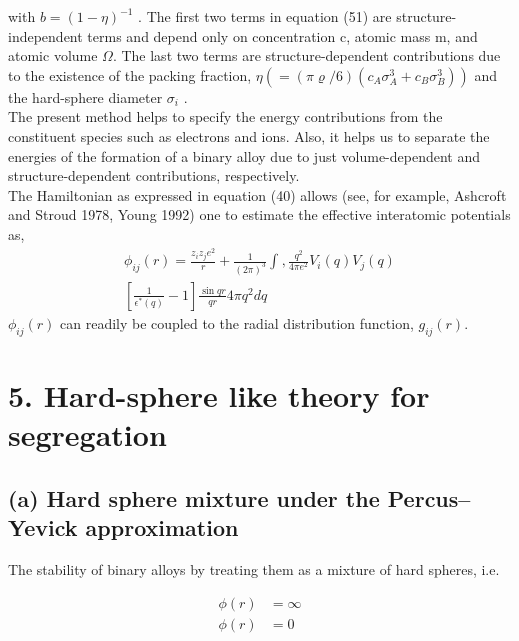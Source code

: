 \documentclass[12pt]{article}
\newcommand*{\1}{\hspace{1pt}}
\begin{document}
with $b = (1 - \eta)^{-1}$ . The first two terms in equation (51) are structure-independent terms and 
depend only on concentration c, atomic mass m, and atomic volume $\Omega $. The last two terms are 
structure-dependent contributions due to the existence of the packing
fraction, $\eta (= (\pi \varrho/6)(c_A\sigma^3_A + c_B\sigma^3_{B})) $ and the hard-sphere diameter $\sigma _{i}$ .\\
    The present method helps to specify the energy contributions from the constituent
species such as electrons and ions. Also, it helps us to separate the energies of the formation
of a binary alloy due to just volume-dependent and structure-dependent contributions,
respectively.\\
The Hamiltonian as expressed in equation (40) allows (see, for example, Ashcroft and Stroud 1978, Young
1992) one to estimate the effective interatomic potentials as,
    \begin{equation}
        \begin{split}
        \phi _{ij}(r) = \frac{z_{i}z_{j}e^2}{r} + \frac{1}{(2\pi)^3}\int_{}^{}  ,\frac{q^2}{4\pi e^2}V_{i}(q)V_{j}(q) \\ 
        \left[\frac{1}{\epsilon ^{\ast}(q) } - 1\right]\frac{\sin qr}{qr} 4\pi q^2 dq 
        \end{split}
    \end{equation}
$\phi _{ij}(r)$ can readily be coupled to the radial distribution function, $g_{ij}(r)$.\\

\section*{5. Hard-sphere like theory for segregation}

\subsection*{(a) Hard sphere mixture under the Percus–Yevick approximation}

The stability of binary alloys by treating them as a mixture of hard spheres, i.e.

\begin{align}
    \phi (r)& = \infty \tag{for $r<0$} \\
    \phi (r)& = 0  \tag{for $r>0$} \\
\end{align}
\end{document}
